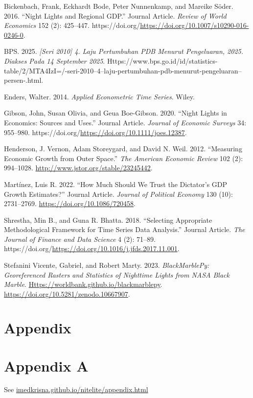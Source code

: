 \documentclass[
]{interact}
\newlength{\cslhangindent}
\newenvironment{CSLReferences}[2] %
 {\begin{list}{}{%
  \setlength{\itemindent}{0pt}
  \setlength{\leftmargin}{0pt}
  \setlength{\parsep}{0pt}
  \ifodd #1
   \setlength{\leftmargin}{\cslhangindent}
   \setlength{\itemindent}{-1\cslhangindent}
  \fi
  \setlength{\itemsep}{#2\baselineskip}}}
 {\end{list}}
\begin{document}
\label{refs}
\begin{CSLReferences}{1}{1}
Bickenbach, Frank, Eckhardt Bode, Peter Nunnenkamp, and Mareike Söder.
2016. {``Night Lights and Regional GDP.''} Journal Article. \emph{Review
of World Economics} 152 (2): 425--447.
https://doi.org/\url{https://doi.org/10.1007/s10290-016-0246-0}.

BPS. 2025. \emph{{[}Seri 2010{]} 4. Laju Pertumbuhan PDB Menurut
Pengeluaran, 2025. Diakses Pada 14 September 2025}.
Https://www.bps.go.id/id/statistics-table/2/MTA4IzI=/-seri-2010--4--laju-pertumbuhan-pdb-menurut-pengeluaran--persen-.html.

Enders, Walter. 2014. \emph{Applied Econometric Time Series}. Wiley.

Gibson, John, Susan Olivia, and Geua Boe-Gibson. 2020. {``Night Lights
in Economics: Sources and Uses.''} Journal Article. \emph{Journal of
Economic Surveys} 34: 955--980.
https://doi.org/\url{https://doi.org/10.1111/joes.12387}.

Henderson, J. Vernon, Adam Storeygard, and David N. Weil. 2012.
{``Measuring Economic Growth from Outer Space.''} \emph{The American
Economic Review} 102 (2): 994--1028.
\url{http://www.jstor.org/stable/23245442}.

Martínez, Luis R. 2022. {``How Much Should We Trust the Dictator's GDP
Growth Estimates?''} Journal Article. \emph{Journal of Political
Economy} 130 (10): 2731--2769. \url{https://doi.org/10.1086/720458}.

Shrestha, Min B., and Guna R. Bhatta. 2018. {``Selecting Appropriate
Methodological Framework for Time Series Data Analysis.''} Journal
Article. \emph{The Journal of Finance and Data Science} 4 (2): 71--89.
https://doi.org/\url{https://doi.org/10.1016/j.jfds.2017.11.001}.

Stefanini Vicente, Gabriel, and Robert Marty. 2023.
\emph{{BlackMarblePy: Georeferenced Rasters and Statistics of Nighttime
Lights from NASA Black Marble}}.
\href{https://worldbank.github.io/blackmarblepy}{Https://worldbank.github.io/blackmarblepy}.
\url{https://doi.org/10.5281/zenodo.10667907}.

\end{CSLReferences}

\section{Appendix}\label{appendix}

\section*{Appendix A}\label{appendix-a}

See \href{appendix.html}{imedkrisna.github.io/nitelite/appendix.html}
\end{document}

